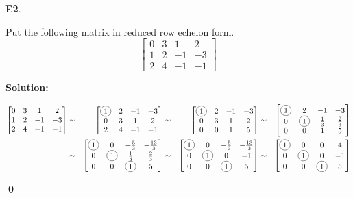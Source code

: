 \documentclass{article}
\newenvironment{problem}[1]
{
  \begin{flushleft}
  \textbf{#1}.
  \ignorespaces
}
{
  \end{flushleft}
}
\newenvironment{solution}
{
  \ignorespaces
  \textbf{Solution:}
}
{
  \ignorespacesafterend
  \begin{flushright}
  {\bfseries \qed}
  \end{flushright}
}
\begin{document}
\begin{problem}{E2}
Put the following matrix in reduced row echelon form.
\[
  \begin{bmatrix}
  0 & 3 & 1 & 2 \\
  1 & 2 & -1 & -3 \\
  2 & 4 & -1 & -1
  \end{bmatrix}
\]
\end{problem}
\begin{solution}
\begin{alignat*}{4}
  \begin{bmatrix}
  0 & 3 & 1 & 2 \\
  1 & 2 & -1 & -3 \\
  2 & 4 & -1 & -1
  \end{bmatrix}
  &\sim&
  \begin{bmatrix}
  \circledNumber{1} & 2 & -1 & -3 \\
  0 & 3 & 1 & 2 \\
  2 & 4 & -1 & -1
  \end{bmatrix}
  &\sim&
  \begin{bmatrix}
  \circledNumber{1} & 2 & -1 & -3 \\
  0 & 3 & 1 & 2 \\
  0 & 0 & 1 & 5
  \end{bmatrix}
  &\sim&
  \begin{bmatrix}
  \circledNumber{1} & 2 & -1 & -3 \\
  0 & \circledNumber{1} & \frac{1}{3} & \frac{2}{3} \\
  0 & 0 & 1 & 5
  \end{bmatrix} \\
  &\sim&
  \begin{bmatrix}
  \circledNumber{1} & 0 & -\frac{5}{3} & -\frac{13}{3} \\
  0 & \circledNumber{1} & \frac{1}{3} & \frac{2}{3} \\
  0 & 0 & \circledNumber{1} & 5
  \end{bmatrix}
  &\sim&
  \begin{bmatrix}
  \circledNumber{1} & 0 & -\frac{5}{3} & -\frac{13}{3} \\
  0 & \circledNumber{1} & 0 & -1 \\
  0 & 0 & \circledNumber{1} & 5
  \end{bmatrix}
  &\sim&
  \begin{bmatrix}
  \circledNumber{1} & 0 & 0 & 4 \\
  0 & \circledNumber{1} & 0 & -1 \\
  0 & 0 & \circledNumber{1} & 5
  \end{bmatrix}
\end{alignat*}
\end{solution}
\end{document}
